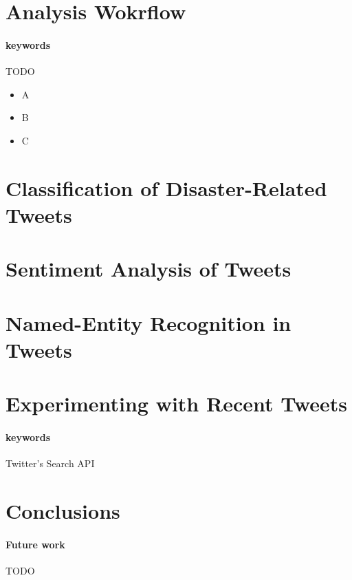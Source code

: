 \documentclass[letterpaper,twocolumn,10pt]{article}
\begin{document}
\section{Analysis Wokrflow}

\paragraph{keywords} TODO

\begin{itemize}[noitemsep,nolistsep]
	\item A
	\item B
	\item C
\end{itemize}



\section{Classification of Disaster-Related Tweets}

\todo{}

\section{Sentiment Analysis of Tweets}

\todo{}

\section{Named-Entity Recognition in Tweets}

\todo{}

\section{Experimenting with Recent Tweets}

\paragraph{keywords} Twitter's Search API

\section{Conclusions}

\paragraph{Future work} TODO


{\footnotesize 
}

\theendnotes
\end{document}
